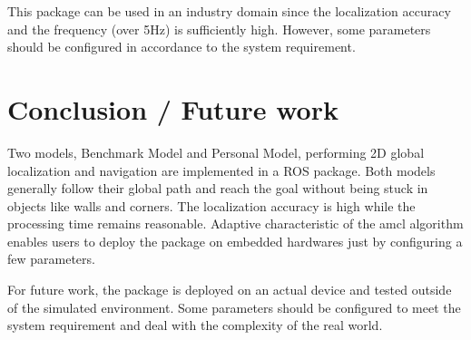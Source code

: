 \documentclass[10pt,journal,compsoc]{IEEEtran}
\begin{document}
This package can be used in an industry domain since the localization accuracy and the frequency (over 5Hz) is sufficiently high. However, some parameters should be configured in accordance to the system requirement.

\section{Conclusion / Future work}
Two models, Benchmark Model and Personal Model, performing 2D global localization and navigation are implemented in a ROS package. Both models generally follow their global path and reach the goal without being stuck in objects like walls and corners. The localization accuracy is high while the processing time remains reasonable. Adaptive characteristic of the amcl algorithm enables users to deploy the package on embedded hardwares just by configuring a few parameters.

For future work, the package is deployed on an actual device and tested outside of the simulated environment. Some parameters should be configured to meet the system requirement and deal with the complexity of the real world.



\end{document}
